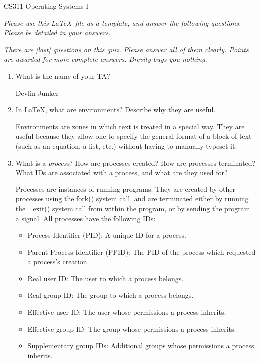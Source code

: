 \documentclass[letterpaper,10pt,onecolumn,titlepage]{article}
\begin{document}


{\Large CS311 Operating Systems I}

\emph{Please use this \LaTeX\ file as a template, and answer the following questions.
  Please be detailed in your answers.}

\emph{There are \ref{last} questions on this quiz. Please answer all of them clearly.
  Points are awarded for more complete answers. Brevity buys you nothing.}


\begin{enumerate}[itemsep=0.1 in]
\item What is the name of your TA?

Devlin Junker

\item In \LaTeX, what are environments? Describe why they are useful.

Environments are zones in which text is treated in a special way.  They are useful because they allow one to specify the general format of a block of text (such as an equation, a list, etc.) without having to manually typeset it.

\item What is a \emph{process}? How are processes created? How are processes terminated?
  What IDs are associated with a process, and what are they used for?

  Processes are instances of running programs. They are created by other processes using the fork() system call, and are terminated either by running the \_exit() system call from within the program, or by sending the program a signal. All processes have the following IDs:

  \begin{itemize}
    \item Process Identifier (PID): A unique ID for a process.
    \item Parent Process Identifier (PPID): The PID of the process which requested a process's creation.
    \item Real user ID: The user to which a process belongs.
    \item Real group ID: The group to which a process belongs.
    \item Effective user ID: The user whose permissions a process inherits.
    \item Effective group ID: The group whose permissions a process inherits.
    \item Supplementary group IDs: Additional groups whose permissions a process inherits.
  \end{itemize}


\end{enumerate}
\end{document}
